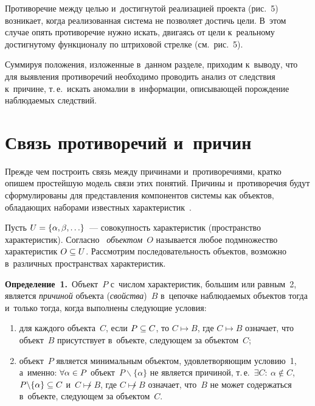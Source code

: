 \begin{multicols}{2}
  



  Противоречие между целью и~достигнутой реализацией проекта (рис.~5) 
возникает, когда реализованная система не позволяет достичь цели. В~этом случае 
опять противоречие нужно искать, двигаясь от цели к~реальному достигнутому 
функционалу по штриховой стрелке (см.\ рис.~5).
  
  Суммируя положения, изложенные в~данном разделе, приходим к~выводу, что 
для выявления противоречий необходимо проводить анализ от следствия 
к~причине, т.\,е.\ искать аномалии в~информации, описывающей порождение 
наблюдаемых следствий. 
  
  
  \section{Связь противоречий и~причин}
  
  Прежде чем построить связь между причинами и~противоречиями, кратко 
опишем простейшую модель связи этих понятий. Причины и~противоречия будут 
сформулированы для представления компонентов системы как объектов, 
обладающих наборами известных характеристик~\cite{4-gr, 5-gr}. 
  
  Пусть $U\hm=\{\alpha, \beta, \ldots\}$~--- совокупность характеристик 
(пространство характеристик). Согласно~\cite{4-gr} \textit{объектом}~$O$ 
называется любое подмножество характеристик $O\hm\subseteq U$. Рассмотрим 
последовательность объектов, возможно в~различных пространствах 
характеристик. 
  
  \smallskip
  
  \noindent
  \textbf{Определение~1.}\ Объект~$P$ с~числом характеристик, большим или 
равным~2, является \textit{причиной} объекта (\textit{свойства})~$B$ в~цепочке 
наблюдаемых объектов тогда и~только тогда, когда выполнены следующие 
условия:
  \begin{enumerate}[(1)]
\item для каждого объекта~$C$, если $P\hm\subseteq C$, то $C\mapsto B$, где 
$C\mapsto B$ означает, что объект~$B$ присутствует в~объекте, следующем за 
объектом~$C$;
\item объект~$P$ является минимальным объектом, удовлетворяющим 
условию~1, а~именно: $\forall \alpha\hm\in P$ объект~$P\backslash \{\alpha\}$ 
не является причиной, т.\,е.\ $\exists C:\ \alpha\not\in C$, $P\backslash 
\{\alpha\}\hm\subseteq C$ и~$C\not\mapsto B$, где $C\not\mapsto B$ означает, 
что~$B$ не может содержаться в~объекте, следующем за объектом~$C$. 
\end{enumerate}


\end{multicols}
